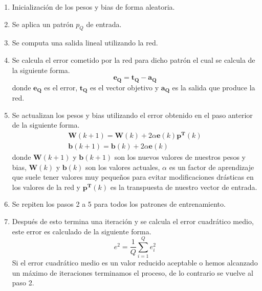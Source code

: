         \begin{enumerate}
            \item Inicialización de los pesos y bias de forma aleatoria.
            \item Se aplica un patrón $p_Q$ de entrada.
            \item Se computa una salida lineal utilizando la red.
            \item Se calcula el error cometido por la red para dicho patrón el cual se calcula de la siguiente forma.
            \[\boldsymbol{e_Q = t_Q - a_Q} \]
            donde $\boldsymbol{e_Q}$ es el error, $\boldsymbol{t_Q}$ es el vector objetivo y $\boldsymbol{a_Q}$ es la salida que produce la red.
            \item Se actualizan los pesos y bias utilizando el error obtenido en el paso anterior de la siguiente forma.
            \begin{gather*}
            \boldsymbol{W}(k+1) = \boldsymbol{W}(k) +2\alpha \boldsymbol{e}(k)\boldsymbol{p^T}(k) \\
            \boldsymbol{b}(k+1) =\boldsymbol{b}(k) + 2\alpha \boldsymbol{e}(k)
            \end{gather*}
            donde $\boldsymbol{W}(k+1)$ y $\boldsymbol{b}(k+1)$ son los nuevos valores de nuestros pesos y bias, $\boldsymbol{W}(k)$ y $\boldsymbol{b}(k)$ son los valores actuales, $\alpha$ es un factor de aprendizaje que suele tener valores muy pequeños para evitar modificaciones drásticas en los valores de la red y $\boldsymbol{p^T}(k)$ es la transpuesta de nuestro vector de entrada.
            \item Se repiten los pasos 2 a 5 para todos los patrones de entrenamiento.
            \item Después de esto termina una iteración y se calcula el error cuadrático medio, este error es calculado de la siguiente forma.
            \[ e^2 = \frac{1}{Q} \sum _{i=1}^{Q} e^2_i \]
            Si el error cuadrático medio es un valor reducido aceptable o hemos alcanzado un máximo de iteraciones terminamos el proceso, de lo contrario se vuelve al paso 2.
        \end{enumerate}
    \newpage